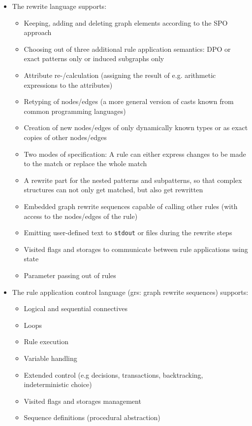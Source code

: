 \begin{itemize}
  \item The rewrite language supports:
  \begin{itemize}
    \item Keeping, adding and deleting graph elements according to the SPO approach
	\item Choosing out of three additional rule application semantics: DPO or exact patterns only or induced subgraphs only
    \item Attribute re-/calculation (assigning the result of e.g. arithmetic expressions to the attributes)
    \item Retyping of nodes/edges (a more general version of casts known from common programming languages)
    \item Creation of new nodes/edges of only dynamically known types or as exact copies of other nodes/edges
	\pagebreak
    \item Two modes of specification: A rule can either express changes to be made to the match or replace the whole match
    \item A rewrite part for the nested patterns and subpatterns, so that complex structures can not only get matched, but also get rewritten
    \item Embedded graph rewrite sequences capable of calling other rules (with access to the nodes/edges of the rule)
    \item Emitting user-defined text to \texttt{stdout} or files during the rewrite steps
	\item Visited flags and storages to communicate between rule applications using state
    \item Parameter passing out of rules
  \end{itemize}
  
  \item The rule application control language (grs: graph rewrite sequences) supports:
  \begin{itemize}
    \item Logical and sequential connectives
    \item Loops
    \item Rule execution
    \item Variable handling
    \item Extended control (e.g decisions, transactions, backtracking, indeterministic choice)
    \item Visited flags and storages management
    \item Sequence definitions (procedural abstraction)
  \end{itemize}
\end{itemize}

